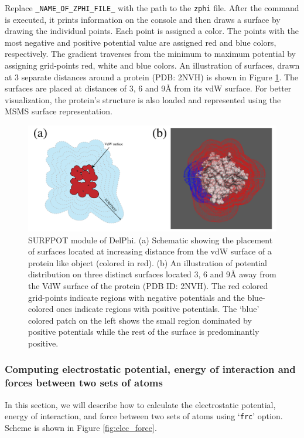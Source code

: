 \documentclass[9pt,tutorial]{livecoms}
\begin{document}
Replace \texttt{\_NAME\_OF\_ZPHI\_FILE\_} with the path to the \texttt{zphi} file. After the command is executed, it prints information on the console and then draws a surface by drawing the individual points. Each point is assigned a color. The points with the most negative and positive potential value are assigned red and blue colors, respectively. The gradient traverses from the minimum to maximum potential by assigning grid-points red, white and blue colors. An illustration of surfaces, drawn at 3 separate distances around a protein (PDB: 2NVH) is shown in Figure \ref{fig:zeta-potential}. The surfaces are placed at distances of 3, 6 and 9Å from its vdW surface. For better visualization, the protein’s structure is also loaded and represented using the MSMS surface representation. 

\begin{figure}
\includegraphics[width=0.95\linewidth]{Figure_9.png}
\caption{SURFPOT module of DelPhi. (a) Schematic showing the placement of surfaces located at increasing distance from the vdW surface of a protein like object (colored in red). (b) An illustration of potential distribution on three distinct surfaces located 3, 6 and 9Å away from the VdW surface of the protein (PDB ID: 2NVH). The red colored grid-points indicate regions with negative potentials and the blue-colored ones indicate regions with positive potentials. The ‘blue’ colored patch on the left shows the small region dominated by positive potentials while the rest of the surface is predominantly positive.}
\label{fig:zeta-potential}
\end{figure}


\subsubsection{Computing electrostatic potential, energy of interaction and forces between two sets of atoms}
In this section, we will describe how to calculate the electrostatic potential, energy of interaction, and force between two sets of atoms using ‘\texttt{frc}’ option. Scheme is shown in Figure \ref{fig:elec_force}.
\end{document}
